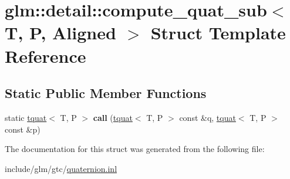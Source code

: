\hypertarget{structglm_1_1detail_1_1compute__quat__sub}{}\section{glm\+:\+:detail\+:\+:compute\+\_\+quat\+\_\+sub$<$ T, P, Aligned $>$ Struct Template Reference}
\label{structglm_1_1detail_1_1compute__quat__sub}
\subsection*{Static Public Member Functions}
\begin{DoxyCompactItemize}
\item 
\mbox{\label{structglm_1_1detail_1_1compute__quat__sub_a712a8acc37b355da790e2542860ff459}} 
static \hyperlink{structglm_1_1tquat}{tquat}$<$ T, P $>$ {\bfseries call} (\hyperlink{structglm_1_1tquat}{tquat}$<$ T, P $>$ const \&q, \hyperlink{structglm_1_1tquat}{tquat}$<$ T, P $>$ const \&p)
\end{DoxyCompactItemize}


The documentation for this struct was generated from the following file\+:\begin{DoxyCompactItemize}
\item 
include/glm/gtc/\hyperlink{gtc_2quaternion_8inl}{quaternion.\+inl}\end{DoxyCompactItemize}
